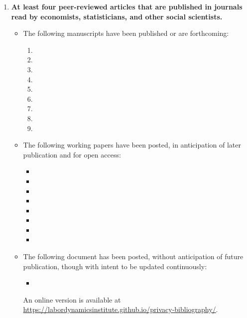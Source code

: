 \documentclass[12pt]{article}
\begin{document}
\begin{enumerate}
	\item \textbf{At least four peer-reviewed articles that are published in journals read by economists, statisticians, and other social scientists.}
	\begin{itemize}
		\item The following manuscripts have been published or are forthcoming:
		\begin{enumerate}[1)]
			\item {}
			\item {}
			\item {}
			\item {}
			\item {}
			\item {}
			\item {}
			\item {}
		    \item {}
	\end{enumerate}

		\item The following working papers have been posted, in anticipation of later publication and for open access:
		\begin{itemize}
			\item {}
			\item {}
			\item {}
			\item {}
			\item {}
			\item {}
			\item {}
			\item {}
		\end{itemize}
	    \item The following document has been posted, without anticipation of future publication, though with intent to be updated continuously:
	    \begin{itemize}
	    	\item {}
	    \end{itemize}
    An online version is available at \url{https://labordynamicsinstitute.github.io/privacy-bibliography/}.
	\end{itemize}




\end{enumerate}
\end{document}

